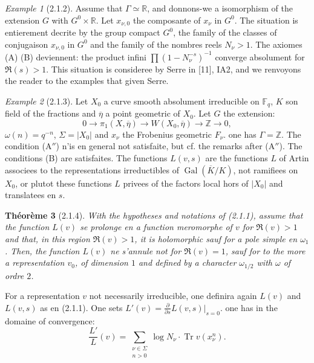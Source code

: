 \documentclass[12pt,a4paper]{article}
\theoremstyle{plain}
\newtheorem{theorem}{Th\'eor\`eme}[section]
\theoremstyle{definition}
\theoremstyle{remark}
\newtheorem{example}[theorem]{Example}
\DeclareMathOperator{\Gal}{Gal}
\DeclareMathOperator{\Tr}{Tr}
\newcommand{\FF}{{\mathbb{F}}}
\newcommand{\RR}{{\mathbb{R}}}
\newcommand{\ZZ}{{\mathbb{Z}}}
\begin{document}
\begin{example}[2.1.2]
Assume that $\Gamma \simeq \RR$, and donnons-we a isomorphism of the extension $G$ with $G^0 \times \RR$. Let $x_{\nu,0}$ the composante of $x_\nu$ in $G^0$. The situation is entierement decrite by the group compact $G^0$, the family of the classes of conjugaison $x_{\nu,0}$ in $G^0$ and the family of the nombres reels $N_\nu > 1$. The axiomes (A) (B) deviennent: the product infini $\prod (1 - N_\nu^{-s})^{-1}$ converge absolument for $\Re(s) > 1$. This situation is consideree by Serre in [11], IA2, and we renvoyons the reader to the examples that given Serre.
\end{example}

\begin{example}[2.1.3]
Let $X_0$ a curve smooth absolument irreducible on $\FF_q$, $K$ son field of the fractions and $\overline{\eta}$ a point geometric of $X_0$. Let $G$ the extension:
\[ 0 \to \pi_1(X, \overline{\eta}) \to W(X_0, \overline{\eta}) \to \ZZ \to 0, \]
$\omega(n) = q^{-n}$, $\Sigma = |X_0|$ and $x_\nu$ the Frobenius geometric $F_\nu$. one has $\Gamma = \ZZ$. The condition (A$''$) n'is en general not satisfaite, but cf. the remarks after (A$''$). The conditions (B) are satisfaites. The functions $L(v, s)$ are the functions $L$ of Artin associees to the representations irreductibles of $\Gal(\overline{K}/K)$, not ramifiees on $X_0$, or plutot these functions $L$ privees of the factors local hors of $|X_0|$ and translatees en $s$.
\end{example}

\begin{theorem}[2.1.4]
With the hypotheses and notations of (2.1.1), assume that the function $L(v)$ se prolonge en a function meromorphe of $v$ for $\Re(v) > 1$ and that, in this region $\Re(v) > 1$, it is holomorphic sauf for a pole simple en $\omega_1$. Then, the function $L(v)$ ne s'annule not for $\Re(v) = 1$, sauf for to the more a representation $v_0$, of dimension $1$ and defined by a character $\omega_{1/2}$ with $\omega$ of ordre $2$.
\end{theorem}

For a representation $v$ not necessarily irreducible, one definira again $L(v)$ and $L(v,s)$ as en (2.1.1). One sets $L'(v) = \frac{\partial}{\partial s} L(v,s)|_{s=0}$. one has in the domaine of convergence:
\begin{equation}\label{eq:2.1.4.1}
\frac{L'}{L}(v) = \sum_{\substack{\nu \in \Sigma \\ n > 0}} \log N_\nu \cdot \Tr v(x_\nu^n).
\end{equation}
\end{document}
